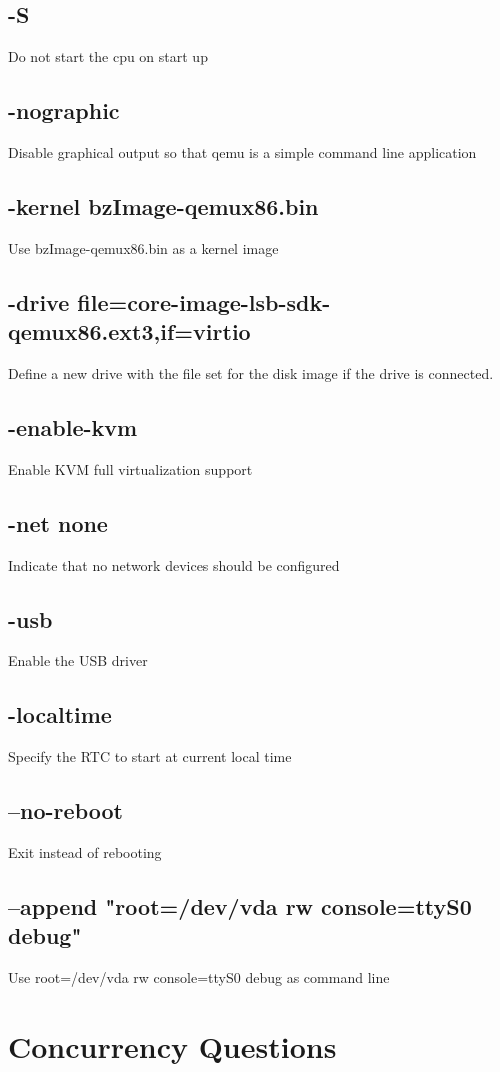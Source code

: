 \documentclass[letterpaper,10pt,titlepage,draftclsnofoot,onecolumn]{IEEEtran}
\begin{document}
\subsection{-S}
Do not start the cpu on start up
\subsection{-nographic}
Disable graphical output so that qemu is a simple command line application
\subsection{-kernel bzImage-qemux86.bin }
Use bzImage-qemux86.bin as a kernel image
\subsection{-drive file=core-image-lsb-sdk-qemux86.ext3,if=virtio }
Define a new drive with the file set for the disk image if the drive is connected.
\subsection{-enable-kvm }
Enable KVM full virtualization support
\subsection{-net none }
Indicate that no network devices should be configured
\subsection{-usb }
Enable the USB driver
\subsection{-localtime }
Specify the RTC to start at current local time
\subsection{--no-reboot}
Exit instead of rebooting 
\subsection{--append "root=/dev/vda rw console=ttyS0 debug"}
Use root=/dev/vda rw console=ttyS0 debug as command line



\section{Concurrency Questions}
\end{document}
